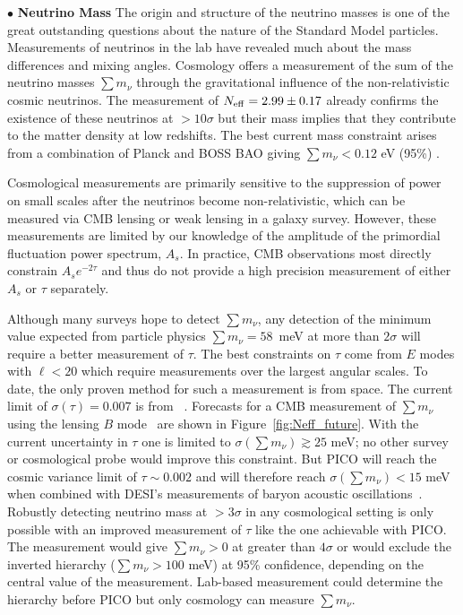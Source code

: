 \documentclass[PICOReport.tex]{subfiles}
\begin{document}
%
%
 $\bullet$ {\bf Neutrino Mass} \hspace{0.1in} \label{neutrino_fundamental} The origin and structure of the neutrino masses is one of the great outstanding  questions about the nature of the Standard Model particles.  Measurements of neutrinos in the lab have revealed much  about the mass differences and mixing angles.  Cosmology offers a  measurement of the sum of the neutrino masses $\sum m_\nu$ through the gravitational influence of the non-relativistic  cosmic neutrinos.  The measurement of ${N_{\rm eff}} = 2.99 \pm 0.17$  already confirms the existence of these neutrinos at $>10\sigma$ but their  mass implies that they contribute to the matter density at low redshifts.  The best current mass constraint arises from a combination of  Planck and BOSS \ac{BAO} giving $\sum m_\nu < 0.12$ eV (95\%) .

Cosmological measurements are primarily sensitive to the suppression of power on small scales after the neutrinos become non-relativistic, which can be measured via CMB lensing or weak lensing in a galaxy survey.  However, these measurements are limited by our knowledge of the amplitude of the primordial fluctuation power spectrum, $A_s$.  In practice, CMB observations most directly constrain $A_s e^{-2 \tau}$ and thus do not provide a high precision measurement of either $A_s$ or $\tau$ separately.  


Although many surveys hope to detect $\sum m_\nu$, any detection of the minimum value expected from particle physics $\sum m_\nu = 58$~meV at more than $2 \sigma$ will require a better measurement of $\tau$.  The best constraints on $\tau$ come from $E$ modes with $\ell < 20$ which require measurements over the largest angular scales. To date, the only proven method for such a measurement is from space. The current limit of $\sigma({\tau}) = 0.007$ is from \planck~\cite{planck2016_xlvi}.  Forecasts for a CMB measurement of $\sum m_\nu$ using the lensing $B$ mode~\cite{Kaplinghat:2003bh} are shown in Figure~\ref{fig:Neff_future}.  With the current uncertainty in $\tau$ one is limited to  $\sigma(\sum m_\nu) \gtrsim 25$ meV; no other survey or cosmological probe would improve this constraint.   But PICO will reach the cosmic variance limit of $\tau \sim 0.002$ and will therefore reach $\sigma(\sum m_\nu) < 15$ meV when combined with DESI's measurements of baryon acoustic oscillations~\cite{Levi:2013gra}.  Robustly detecting neutrino mass at  $> 3\sigma$ in any cosmological setting is only possible with an improved measurement of $\tau$ like the one achievable with PICO. The measurement would give  $\sum m_\nu>0$ at greater than $4\sigma$ or would exclude the inverted hierarchy ($\sum m_\nu > 100$ meV) at 95\% confidence, depending on the central value of the measurement.  Lab-based measurement could determine the hierarchy before PICO but only cosmology can measure $\sum m_\nu$.
\end{document}
